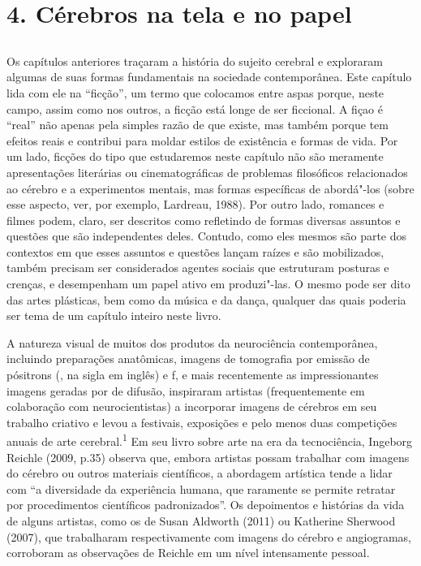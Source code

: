 \part{4. Cérebros na tela e no papel}

\chapter*{}

Os capítulos anteriores traçaram a história do sujeito cerebral e
exploraram algumas de suas formas fundamentais na sociedade
contemporânea. Este capítulo lida com ele na ``ficção'', um termo que
colocamos entre aspas porque, neste campo, assim como nos outros, a
ficção está longe de ser ficcional. A fiçao é ``real'' não apenas pela
simples razão de que existe, mas também porque tem efeitos reais e
contribui para moldar estilos de existência e formas de vida. Por um
lado, ficções do tipo que estudaremos neste capítulo não são meramente
apresentações literárias ou cinematográficas de problemas filosóficos
relacionados ao cérebro e a experimentos mentais, mas formas específicas
de abordá"-los (sobre esse aspecto, ver, por exemplo, Lardreau, 1988).
Por outro lado, romances e filmes podem, claro, ser descritos como
refletindo de formas diversas assuntos e questões que são independentes
deles. Contudo, como eles mesmos são parte dos contextos em que esses
assuntos e questões lançam raízes e são mobilizados, também precisam ser
considerados agentes sociais que estruturam posturas e crenças, e
desempenham um papel ativo em produzi"-las. O mesmo pode ser dito das
artes plásticas, bem como da música e da dança, qualquer das quais
poderia ser tema de um capítulo inteiro neste livro.

A natureza visual de muitos dos produtos da neurociência contemporânea,
incluindo preparações anatômicas, imagens de tomografia por emissão de
pósitrons (, na sigla em inglês) e f, e mais recentemente as
impressionantes imagens geradas por  de difusão, inspiraram artistas
(frequentemente em colaboração com neurocientistas) a incorporar imagens
de cérebros em seu trabalho criativo e levou a festivais, exposições e
pelo menos duas competições anuais de arte cerebral.\textsuperscript{1}
Em seu livro sobre arte na era da tecnociência, Ingeborg Reichle (2009,
p.35) observa que, embora artistas possam trabalhar com imagens do
cérebro ou outros materiais científicos, a abordagem artística tende a
lidar com ``a diversidade da experiência humana, que raramente se
permite retratar por procedimentos científicos padronizados''. Os
depoimentos e histórias da vida de alguns artistas, como os de Susan
Aldworth (2011) ou Katherine Sherwood (2007), que trabalharam
respectivamente com imagens do cérebro e angiogramas, corroboram as
observações de Reichle em um nível intensamente pessoal.

